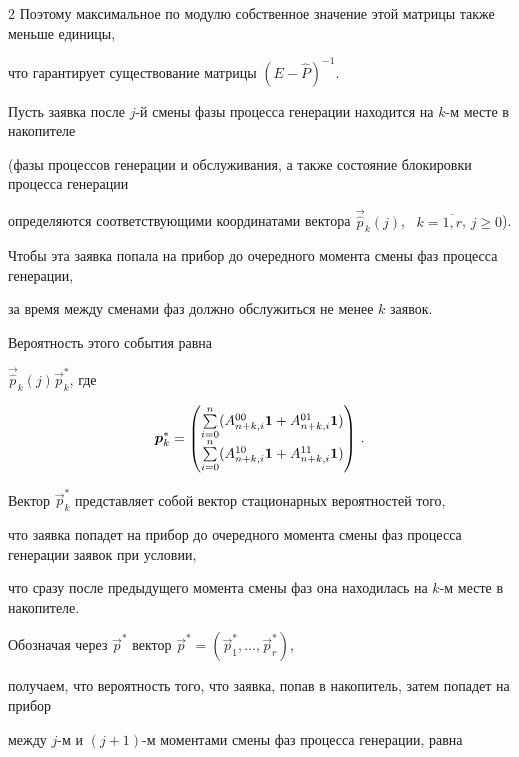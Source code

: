 \begin{multicols}{2}
Поэтому максимальное по модулю собственное значение этой матрицы также меньше единицы,


что гарантирует существование матрицы $(E-\hat P)^{-1}$.





Пусть заявка после $j$-й смены фазы процесса генерации находится на $k$-м месте в накопителе


(фазы процессов генерации и обслуживания, а также состояние блокировки процесса генерации


определяются соответствующими координатами вектора $\vec{\hat p}_{k}(j)$, \ $k=\overline{1,r}$, $j\ge0$).


Чтобы эта заявка попала на прибор до очередного момента смены фаз процесса генерации,


за время между сменами фаз должно обслужиться не менее $k$ заявок.


Вероятность этого события равна


$


\vec{\hat p}_{k}(j) \vec{p}_k^*


$, где


$$


\vec{p}_k^*=


\begin{pmatrix}


\sum\limits_{i=0}^{n}(A_{n+k,i}^{00}{\bf 1}+A_{n+k,i}^{01}{\bf 1})\\[6pt]


\sum\limits_{i=0}^{n}(A_{n+k,i}^{10}{\bf 1}+A_{n+k,i}^{11}{\bf 1})


\end{pmatrix}\,.


$$


Вектор $\vec{p}_k^*$ представляет собой вектор стационарных вероятностей того,


что заявка попадет на прибор до очередного момента смены фаз процесса генерации заявок при условии,


что сразу после предыду\-ще\-го момента смены фаз она находилась на $k$-м месте в накопителе.


Обозначая через $\vec{p}^*$ вектор $\vec{p}^*=(\vec{p}_1^*,\ldots,\vec{p}_r^*)$,


получаем, что вероятность того, что заявка, попав в накопитель, затем попадет на прибор


между $j$-м и $(j+1)$-м моментами смены фаз процесса генерации, равна


$$



\end{multicols}
